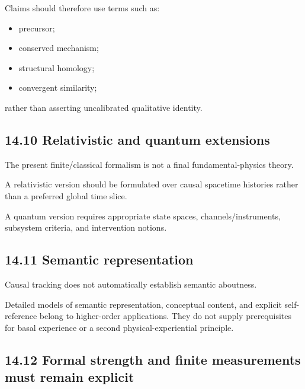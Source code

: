 \documentclass[
  11pt,
  a4paper,
]{article}
\providecommand{\tightlist}{%
  \setlength{\itemsep}{0pt}\setlength{\parskip}{0pt}}
\begin{document}
Claims should therefore use terms such as:

\begin{itemize}
\tightlist
\item
  precursor;
\item
  conserved mechanism;
\item
  structural homology;
\item
  convergent similarity;
\end{itemize}

rather than asserting uncalibrated qualitative identity.

\hypertarget{relativistic-and-quantum-extensions}{%
\subsection{14.10 Relativistic and quantum
extensions}\label{relativistic-and-quantum-extensions}}

The present finite/classical formalism is not a final
fundamental-physics theory.

A relativistic version should be formulated over causal spacetime
histories rather than a preferred global time slice.

A quantum version requires appropriate state spaces,
channels/instruments, subsystem criteria, and intervention notions.

\hypertarget{semantic-representation}{%
\subsection{14.11 Semantic
representation}\label{semantic-representation}}

Causal tracking does not automatically establish semantic aboutness.

Detailed models of semantic representation, conceptual content, and
explicit self-reference belong to higher-order applications. They do not
supply prerequisites for basal experience or a second
physical-experiential principle.

\hypertarget{formal-strength-and-finite-measurements-must-remain-explicit}{%
\subsection{14.12 Formal strength and finite measurements must remain
explicit}\label{formal-strength-and-finite-measurements-must-remain-explicit}}
\end{document}
